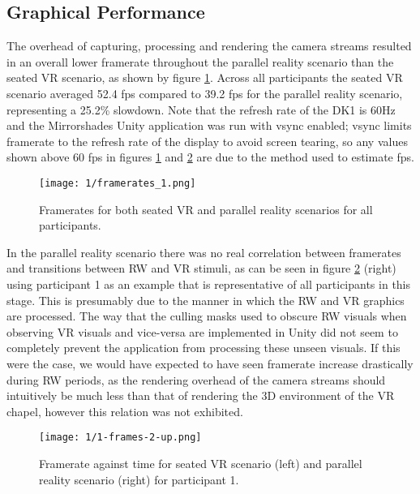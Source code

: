 \subsection{Graphical Performance}
\label{stage-1-framerates}
The overhead of capturing, processing and rendering the camera streams resulted in an overall lower framerate throughout the parallel reality scenario than the seated VR scenario, as shown by figure \ref{framerates_1.png}. Across all participants the seated VR scenario averaged 52.4 fps compared to 39.2 fps for the parallel reality scenario, representing a 25.2\% slowdown. Note that the refresh rate of the DK1 is 60Hz and the Mirrorshades Unity application was run with vsync enabled; vsync limits framerate to the refresh rate of the display to avoid screen tearing, so any values shown above 60 fps in figures \ref{framerates_1.png} and \ref{1-frames-2-up.png} are due to the method used to estimate fps.

\begin{figure}[ht]
	\begin{center}
		\texttt{[image: 1/framerates\_1.png]}
		\caption{Framerates for both seated VR and parallel reality scenarios for all participants.}
		\label{framerates_1.png}
	\end{center}
\end{figure}

In the parallel reality scenario there was no real correlation between framerates and transitions between RW and VR stimuli, as can be seen in figure \ref{1-frames-2-up.png} (right) using participant 1 as an example that is representative of all participants in this stage. This is presumably due to the manner in which the RW and VR graphics are processed. The way that the culling masks used to obscure RW visuals when observing VR visuals and vice-versa are implemented in Unity did not seem to completely prevent the application from processing these unseen visuals. If this were the case, we would have expected to have seen framerate increase drastically during RW periods, as the rendering overhead of the camera streams should intuitively be much less than that of rendering the 3D environment of the VR chapel, however this relation was not exhibited.

\begin{figure}[ht]
	\begin{center}
		\texttt{[image: 1/1-frames-2-up.png]}
		\caption{Framerate against time for seated VR scenario (left) and parallel reality scenario (right) for participant 1.}
		\label{1-frames-2-up.png}
	\end{center}
\end{figure}

